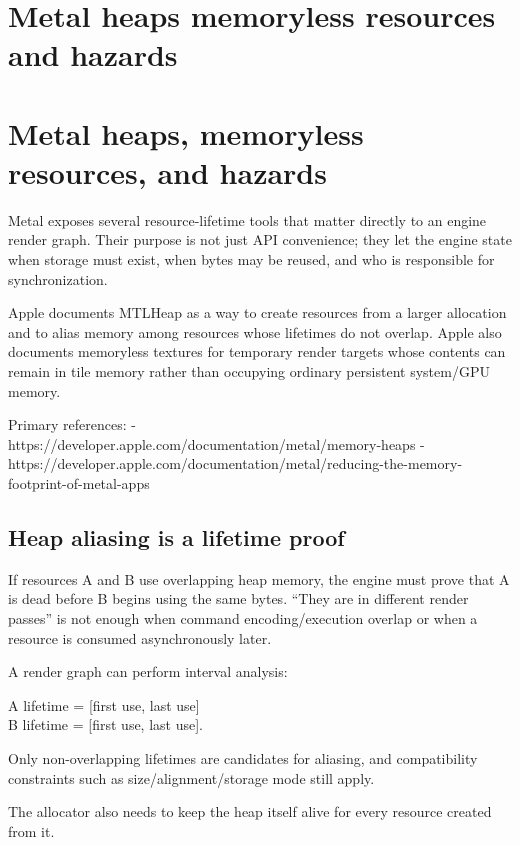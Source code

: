 \hypertarget{appendix-563b2cb23fc3}{}
\section*{Metal heaps memoryless resources and hazards}
\section{Metal heaps, memoryless resources, and hazards}\label{appendix-563b2cb23fc3-metal-heaps-memoryless-resources-and-hazards}

Metal exposes several resource-lifetime tools that matter directly to an engine render graph. Their purpose is not just API convenience; they let the engine state when storage must exist, when bytes may be reused, and who is responsible for synchronization.

Apple documents MTLHeap as a way to create resources from a larger allocation and to alias memory among resources whose lifetimes do not overlap. Apple also documents memoryless textures for temporary render targets whose contents can remain in tile memory rather than occupying ordinary persistent system/GPU memory.

Primary references: - https://developer.apple.com/documentation/metal/memory-heaps - https://developer.apple.com/documentation/metal/reducing-the-memory-footprint-of-metal-apps

\subsection{Heap aliasing is a lifetime proof}\label{appendix-563b2cb23fc3-heap-aliasing-is-a-lifetime-proof}

If resources A and B use overlapping heap memory, the engine must prove that A is dead before B begins using the same bytes. ``They are in different render passes'' is not enough when command encoding/execution overlap or when a resource is consumed asynchronously later.

A render graph can perform interval analysis:

A lifetime = {[}first use, last use{]}\\
B lifetime = {[}first use, last use{]}.

Only non-overlapping lifetimes are candidates for aliasing, and compatibility constraints such as size/alignment/storage mode still apply.

The allocator also needs to keep the heap itself alive for every resource created from it.

